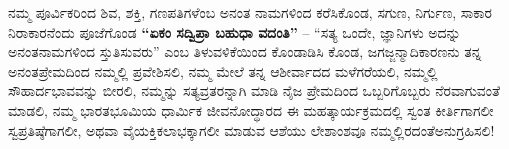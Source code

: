 ನಮ್ಮ ಪೂರ್ವಿಕರಿಂದ ಶಿವ, ಶಕ್ತಿ, ಗಣಪತಿಗಳೆಂಬ ಅನಂತ ನಾಮಗಳಿಂದ ಕರೆಸಿಕೊಂಡ, ಸಗುಣ, ನಿರ್ಗುಣ, ಸಾಕಾರ ನಿರಾಕಾರನೆಂದು ಪೂಜೆಗೊಂಡ \textbf{“ಏಕಂ ಸದ್ವಿಪ್ರಾ ಬಹುಧಾ ವದಂತಿ”} – “ಸತ್ಯ ಒಂದೇ, ಜ್ಞಾನಿಗಳು ಅದನ್ನು ಅನಂತನಾಮಗಳಿಂದ ಸ್ತುತಿಸುವರು” ಎಂಬ ತಿಳುವಳಿಕೆಯಿಂದ ಕೊಂಡಾಡಿಸಿ ಕೊಂಡ, ಜಗಜ್ಜನ್ಮಾದಿಕಾರಣನು ತನ್ನ ಅನಂತಪ್ರೇಮದಿಂದ ನಮ್ಮಲ್ಲಿ ಪ್ರವೇಶಿಸಲಿ, ನಮ್ಮ ಮೇಲೆ ತನ್ನ ಆಶೀರ್ವಾದದ ಮಳೆಗರೆಯಲಿ, ನಮ್ಮಲ್ಲಿ ಸೌಹಾರ್ದಭಾವವನ್ನು ಬೀರಲಿ, ನಮ್ಮನ್ನು ಸತ್ಯವ್ರತರನ್ನಾಗಿ ಮಾಡಿ ನೈಜ ಪ್ರೇಮದಿಂದ ಒಬ್ಬರಿಗೊಬ್ಬರು ನೆರವಾಗುವಂತೆ ಮಾಡಲಿ, ನಮ್ಮ ಭಾರತಭೂಮಿಯ ಧಾರ್ಮಿಕ ಜೀವನೋದ್ಧಾರದ ಈ ಮಹತ್ಕಾರ್ಯಕ್ರಮದಲ್ಲಿ ಸ್ವಂತ ಕೀರ್ತಿಗಾಗಲೀ ಸ್ವಪ್ರತಿಷ್ಠೆಗಾಗಲೀ, ಅಥವಾ ವೈಯಕ್ತಿಕಲಾಭಕ್ಕಾಗಲೀ ಮಾಡುವ ಆಶೆಯು ಲೇಶಾಂಶವೂ ನಮ್ಮಲ್ಲಿರದಂತೆ\break ಅನುಗ್ರಹಿಸಲಿ!

